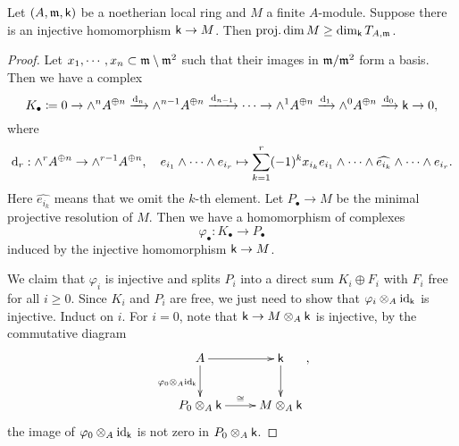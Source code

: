    
    \begin{lemma}\label{lem: dimension of tangent space is bounded by projective dimension of k}
        Let \((A,{\mathfrak{m}},{\mathsf{k}})\) be a noetherian local ring and \(M\) a finite \(A\)-module.
        Suppose there is an injective homomorphism \({\mathsf{k}} \to M\).
        Then \(\operatorname{proj.dim} M \geq \dim_{\mathsf{k}} T_{A,{\mathfrak{m}}}\).
    \end{lemma}
    \begin{proof}
        Let \(x_1,\cdots,x_n \subset {\mathfrak{m}} \setminus {\mathfrak{m}}^2\) such that their images in \({\mathfrak{m}}/{\mathfrak{m}}^2\) form a basis.
        Then we have a complex
        \[ K_\bullet \coloneqq 0 \to \wedge^n A^{\oplus n} \xrightarrow{{\mathrm{d}}_n} \wedge^{n-1} A^{\oplus n} \xrightarrow{{\mathrm{d}}_{n-1}} \cdots \to \wedge^1 A^{\oplus n} \xrightarrow{{\mathrm{d}}_1} \wedge^0 A^{\oplus n} \xrightarrow{{\mathrm{d}}_0} {\mathsf{k}} \to 0, \]
        where 
        \[ {\mathrm{d}}_r: \wedge^r A^{\oplus n} \to \wedge^{r-1} A^{\oplus n}, \quad e_{i_1}\wedge \cdots \wedge e_{i_r} \mapsto \sum_{k=1}^r (-1)^k x_{i_k} e_{i_1}\wedge \cdots \wedge \widehat{e_{i_k}} \wedge \cdots \wedge e_{i_r}. \]
        Here \(\widehat{e_{i_k}}\) means that we omit the \(k\)-th element.
        Let \(P_\bullet \to M\) be the minimal projective resolution of \(M\).
        Then we have a homomorphism of complexes
        \[ \varphi_\bullet: K_\bullet \to P_\bullet \]
        induced by the injective homomorphism \({\mathsf{k}} \to M\).
        
        We claim that \(\varphi_i\) is injective and splits \(P_i\) into a direct sum \(K_i \oplus F_i\) with \(F_i\) free for all \(i \geq 0\).
        Since \(K_i\) and \(P_i\) are free, we just need to show that \(\varphi_i \otimes_A {\operatorname{id}}_{\mathsf{k}}\) is injective.
        Induct on \(i\).
        For \(i = 0\), note that \( {\mathsf{k}} \to M\otimes_A {\mathsf{k}}\) is injective, by the commutative diagram
        \[ \xymatrix{
            A \ar[r] \ar[d]_{\varphi_0\ten_A \id_\kk} & \kk \ar[d] \\
            P_0\ten_A \kk \ar[r]^{\cong} & M\ten_A \kk
        }, \]
        the image of \(\varphi_0\otimes_A {\operatorname{id}}_{\mathsf{k}}\) is not zero in \(P_0\otimes_A {\mathsf{k}}\).
        

\end{proof}
